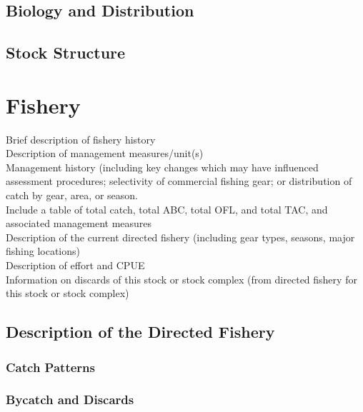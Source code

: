 \documentclass[
  11pt,
]{article}
\begin{document}
\hypertarget{biology-and-distribution}{%
\subsection{Biology and Distribution}\label{biology-and-distribution}}

\hypertarget{stock-structure}{%
\subsection{Stock Structure}\label{stock-structure}}

\hypertarget{fishery}{%
\section{Fishery}\label{fishery}}

Brief description of fishery history\\
Description of management measures/unit(s)\\
Management history (including key changes which may have influenced assessment procedures; selectivity of commercial fishing gear; or distribution of catch by gear, area, or season.\\
Include a table of total catch, total ABC, total OFL, and total TAC, and associated management measures\\
Description of the current directed fishery (including gear types, seasons, major fishing locations)\\
Description of effort and CPUE\\
Information on discards of this stock or stock complex (from directed fishery for this stock or stock complex)

\hypertarget{description-of-the-directed-fishery}{%
\subsection{Description of the Directed Fishery}\label{description-of-the-directed-fishery}}

\hypertarget{catch-patterns}{%
\subsubsection{Catch Patterns}\label{catch-patterns}}

\hypertarget{bycatch-and-discards}{%
\subsubsection{Bycatch and Discards}\label{bycatch-and-discards}}
\end{document}
